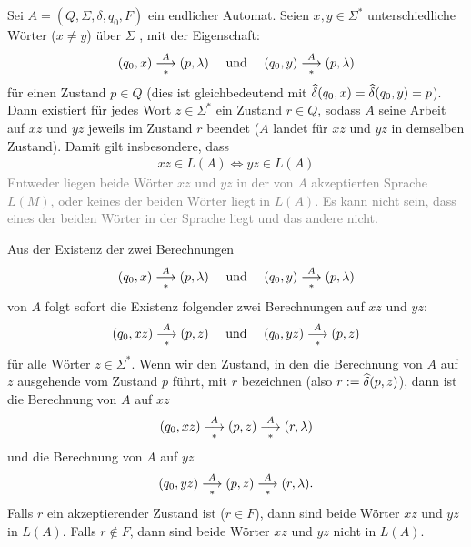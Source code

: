 \begin{mytheorem}\label{mytheorem:pfad_invarianz}
	Sei $A = (Q,\Sigma,\delta,q_0,F)$ ein endlicher Automat. Seien $x,y\in\Sigma^*$ unterschiedliche Wörter ($x\neq y$) über $\Sigma$ , mit der Eigenschaft:
	\begin{align*}
		(q_0,x)\underset{*}{\overset{A}{\longrightarrow}} (p,\lambda) \quad \text{ und } \quad (q_0,y)\underset{*}{\overset{A}{\longrightarrow}} (p,\lambda)
	\end{align*}
	für einen Zustand $p\in Q$ (dies ist gleichbedeutend mit $\widehat{\delta}(q_0,x) = \widehat{\delta}(q_0,y) = p$). Dann existiert für jedes Wort $z\in\Sigma^*$ ein Zustand $r\in Q$, sodass $A$ seine Arbeit auf $xz$ und $yz$ jeweils im Zustand $r$ beendet ($A$ landet für $xz$ und $yz$ in demselben Zustand). Damit gilt insbesondere, dass
	\begin{align*}
		xz \in L(A) \Longleftrightarrow yz \in L(A)
	\end{align*}
	\textcolor{Gray}{Entweder liegen beide Wörter $xz$ und $yz$ in der von $A$ akzeptierten Sprache $L(M)$, oder keines der beiden Wörter liegt in $L(A)$. Es kann nicht sein, dass eines der beiden Wörter in der Sprache liegt und das andere nicht.}

	\begin{myproof}
		Aus der Existenz der zwei Berechnungen
		\begin{align*}
			(q_0,x)\underset{*}{\overset{A}{\longrightarrow}} (p,\lambda) \quad \text{ und } \quad (q_0,y)\underset{*}{\overset{A}{\longrightarrow}} (p,\lambda)
		\end{align*}
		von $A$ folgt sofort die Existenz folgender zwei Berechnungen auf $xz$ und $yz$:
		\begin{align*}
			(q_0,xz)\underset{*}{\overset{A}{\longrightarrow}} (p,z) \quad \text{ und } \quad (q_0,yz)\underset{*}{\overset{A}{\longrightarrow}} (p,z)
		\end{align*}
		für alle Wörter $z\in\Sigma^*$. Wenn wir den Zustand, in den die Berechnung von $A$ auf $z$ ausgehende vom Zustand $p$ führt, mit $r$ bezeichnen (also $r:= \widehat{\delta}(p,z)$), dann ist die Berechnung von $A$ auf $xz$
		\begin{align*}
			(q_0,xz)\underset{*}{\overset{A}{\longrightarrow}} (p,z)\underset{*}{\overset{A}{\longrightarrow}} (r,\lambda)
		\end{align*}
		und die Berechnung von $A$ auf $yz$
		\begin{align*}
			(q_0,yz)\underset{*}{\overset{A}{\longrightarrow}} (p,z)\underset{*}{\overset{A}{\longrightarrow}} (r,\lambda).
		\end{align*}
		Falls $r$ ein akzeptierender Zustand ist ($r\in F$), dann sind beide Wörter $xz$ und $yz$ in $L(A)$. Falls $r\notin F$, dann sind beide Wörter $xz$ und $yz$ nicht in $L(A)$.
	\end{myproof}
\end{mytheorem}


